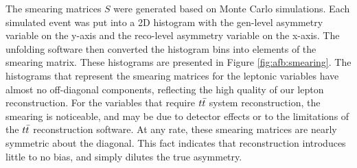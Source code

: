 The smearing matrices $S$ were generated based on Monte Carlo
simulations. Each simulated event was put into a 2D histogram with the
gen-level asymmetry variable on the y-axis and the reco-level
asymmetry variable on the x-axis. The unfolding software then
converted the histogram bins into elements of the smearing
matrix. These histograms are presented in Figure
\ref{fig:afb:smearing}. The histograms that represent the smearing
matrices for the leptonic variables have almost no off-diagonal
components, reflecting the high quality of our lepton
reconstruction. For the variables that require $t\bar{t}$ system
reconstruction, the smearing is noticeable, and may be due to detector
effects or to the limitations of the $t\bar{t}$ reconstruction
software. At any rate, these smearing matrices are nearly symmetric
about the diagonal. This fact indicates that reconstruction introduces
little to no bias, and simply dilutes the true asymmetry.

